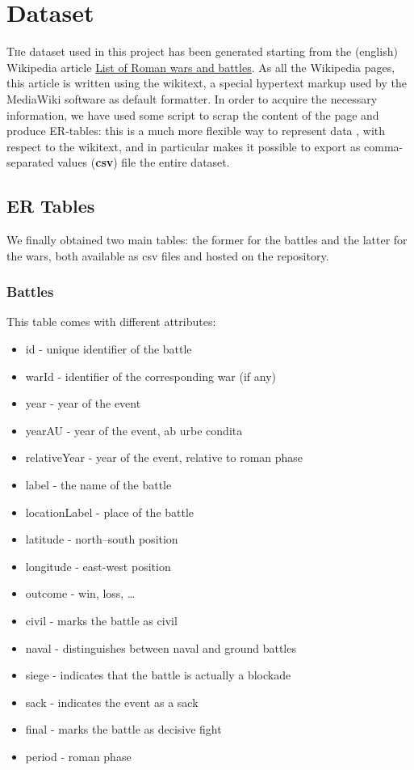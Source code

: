 \section{Dataset}

\lettrine[nindent=0em,lines=3]{T} he dataset used in this project has been generated starting from the (english) Wikipedia article \href{https://en.wikipedia.org/w/index.php?title=List_of_Roman_wars_and_battles}{List of Roman wars and battles}. As all the Wikipedia pages, this article is written using the wikitext, a special hypertext markup used by the MediaWiki software as default formatter. In order to acquire the necessary information, we have used some script to scrap the content of the page and produce ER-tables: this is a much more flexible way to represent data \cite{Chen76}, with respect to the wikitext, and in particular makes it possible to export as comma-separated values (\textbf{csv}) file the entire dataset.

\subsection{ER Tables}
We finally obtained two main tables: the former for the battles and the latter for the wars, both available as csv files and hosted on the repository.

\subsubsection{Battles}
This table comes with different attributes:
\begin{itemize}
    \item id - unique identifier of the battle
    \item warId - identifier of the corresponding war (if any)
    \item year - year of the event
    \item yearAU - year of the event, ab urbe condita
    \item relativeYear - year of the event, relative to roman phase
    \item label - the name of the battle
    \item locationLabel - place of the battle
    \item latitude - north–south position
    \item longitude - east-west position
    \item outcome - win, loss, \dots
    \item civil - marks the battle as civil
    \item naval - distinguishes between naval and ground battles
    \item siege - indicates that the battle is actually a blockade
    \item sack - indicates the event as a sack
    \item final - marks the battle as decisive fight
    \item period - roman phase
\end{itemize}

